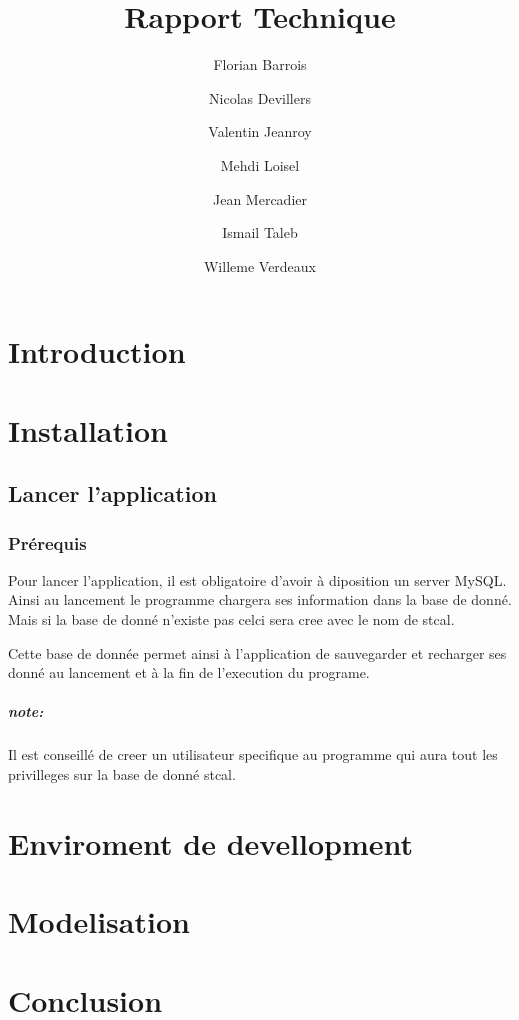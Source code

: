 \documentclass[a4paper,10pt]{report}
\title{Rapport Technique}
\author{Florian Barrois \and Nicolas Devillers \and Valentin Jeanroy \and Mehdi Loisel \and Jean Mercadier \and Ismail Taleb \and Willeme Verdeaux}
\begin{document}
\thispagestyle{headings}

\maketitle

\tableofcontents

\chapter*{Introduction}

\chapter{Installation}

\section{Lancer l'application}

\subsection{Prérequis}

	Pour lancer l'application, il est obligatoire d'avoir à diposition un server MySQL. Ainsi au lancement le programme chargera ses information dans la base de donné. Mais si la base de donné n'existe pas celci sera cree avec le nom de stcal.


	Cette base de donnée permet ainsi à l'application de sauvegarder et recharger ses donné au lancement et à la fin de l'execution du programe.

\paragraph*{note:}
	Il est conseillé de creer un utilisateur specifique au programme qui aura tout les privilleges sur la base de donné stcal.

\chapter{Enviroment de devellopment}


\chapter{Modelisation}

\chapter*{Conclusion}
\end{document}
